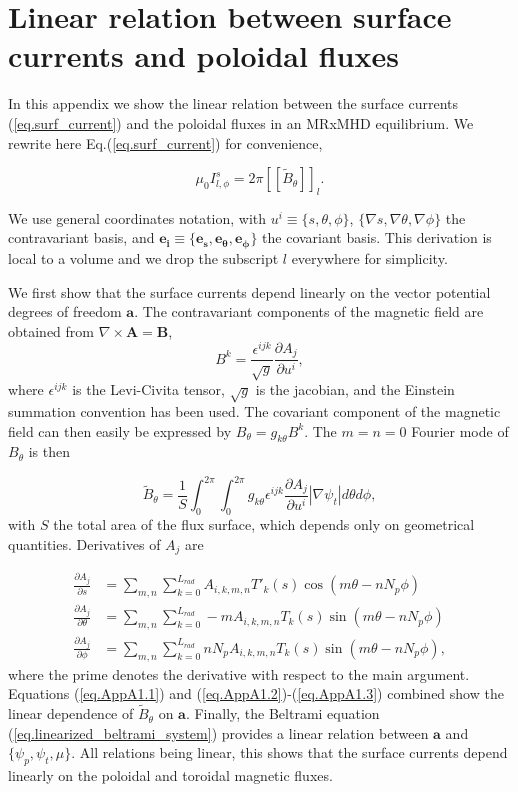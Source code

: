 \chapter{Linear relation between surface currents and poloidal fluxes}\label{appA1}

In this appendix we show the linear relation between the surface currents (\ref{eq.surf_current}) and the poloidal fluxes in an \ac{MRxMHD} equilibrium. We rewrite here Eq.(\ref{eq.surf_current}) for convenience,

\begin{equation}
	\mu_0I^s_{l,\phi} = 2\pi\left[\left[\tilde{B}_\theta\right]\right]_l.
\end{equation}

We use general coordinates notation, with $u^i\equiv\{s,\theta,\phi\}$, $\{\nabla s,\nabla\theta,\nabla\phi\}$ the contravariant basis, and $\mathbf{e_i}\equiv\{\mathbf{e_s},\mathbf{e_\theta},\mathbf{e_\phi}\}$ the covariant basis. This derivation is local to a volume and we drop the subscript $l$ everywhere for simplicity.

We first show that the surface currents depend linearly on the vector potential degrees of freedom $\mathbf{a}$. The contravariant components of the magnetic field are obtained from $\nabla\times\mathbf{A}=\mathbf{B}$,
\begin{equation}
	B^k = \frac{\epsilon^{ijk}}{\sqrt{g}}\frac{\partial A_j}{\partial u^i},
\end{equation}
where  $\epsilon^{ijk}$ is the Levi-Civita tensor, $\sqrt{g}$ is the jacobian, and the Einstein summation convention has been used. The covariant component of the magnetic field can then easily be expressed by $B_\theta = g_{k\theta}B^k$. The $m=n=0$ Fourier mode of $B_\theta$ is then

\begin{equation}
	\tilde{B}_\theta = \frac{1}{S}\int_0^{2\pi}\int_0^{2\pi} g_{k\theta}\epsilon^{ijk}\frac{\partial A_j}{\partial u^i}|\nabla\psi_t| d\theta d\phi, \label{eq.AppA1.1}
\end{equation}
with $S$ the total area of the flux surface, which depends only on geometrical quantities. Derivatives of $A_j$ are

\begin{align}
	\frac{\partial A_j}{\partial s} &= \sum_{m,n}\sum_{k=0}^{L_{rad}} A_{i,k,m,n}T'_k(s)\cos(m\theta-nN_p\phi) \label{eq.AppA1.2} \\
	\frac{\partial A_j}{\partial \theta} &= \sum_{m,n}\sum_{k=0}^{L_{rad}} -mA_{i,k,m,n}T_k(s)\sin(m\theta-nN_p\phi) \\
	\frac{\partial A_j}{\partial \phi} &= \sum_{m,n}\sum_{k=0}^{L_{rad}} nN_pA_{i,k,m,n}T_k(s)\sin(m\theta-nN_p\phi) , \label{eq.AppA1.3}
\end{align}
where the prime denotes the derivative with respect to the main argument. Equations (\ref{eq.AppA1.1}) and (\ref{eq.AppA1.2})-(\ref{eq.AppA1.3}) combined show the linear dependence of $\tilde{B}_\theta$ on $\mathbf{a}$. Finally, the Beltrami equation (\ref{eq.linearized_beltrami_system}) provides a linear relation between $\mathbf{a}$ and $\{\psi_p,\psi_t,\mu\}$. All relations being linear, this shows that the surface currents depend linearly on the poloidal and toroidal magnetic fluxes.

